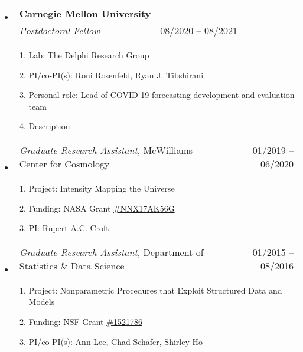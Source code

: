 \documentclass[letterpaper,10pt]{article}
\makeatletter
\newcommand{\subheadingoneline}[2]{
\begin{tabular*}{6.45in}{l@{\cftdotfill{\cftsecdotsep}\extracolsep{\fill}}r}
#1 & #2 \\ 
\end{tabular*}}
\newcommand{\subheadingtwolines}[4]{
\begin{tabular*}{6.45in}{l@{\cftdotfill{\cftsecdotsep}\extracolsep{\fill}}r}
#1 & #2 \\
#3 & #4 \\
\end{tabular*}}
\makeatother
\begin{document}
\begin{itemize}[leftmargin=0.4cm, itemsep=0.5cm]

\item[] \hspace{-2ex}\subheadingtwolines{\bf Carnegie Mellon University}{}{\emph{Postdoctoral Fellow}}{08/2020 -- 08/2021}
\vspace{-0.1cm}

\begin{enumerate}[leftmargin=0.5cm, itemsep=-0.05ex]
	\item[] Lab: The Delphi Research Group
	\item[] PI/co-PI(s): Roni Rosenfeld, Ryan J. Tibshirani
	\item[] Personal role: Lead of COVID-19 forecasting development and evaluation team
	\item[] Description:
\vspace{-0.1cm}
{}
\end{enumerate}

\item[] \hspace{-2ex}\subheadingoneline{{\it Graduate Research Assistant}, McWilliams Center for Cosmology}{01/2019 -- 06/2020}
\vspace{-0.1cm}

\begin{enumerate}[leftmargin=0.5cm, itemsep=-0.05ex]
	\item[] Project: Intensity Mapping the Universe
	\item[] Funding: NASA Grant \href{http://adsabs.harvard.edu/abs/2016atp..prop...26C}{\#NNX17AK56G}
	\item[] PI: Rupert A.C. Croft
\end{enumerate}

\item[] \hspace{-2ex}\subheadingoneline{{\it Graduate Research Assistant}, Department of Statistics \& Data Science}{01/2015 -- 08/2016}
\vspace{-0.1cm}

\begin{enumerate}[leftmargin=0.5cm, itemsep=-0.05ex]
	\item[] Project: Nonparametric Procedures that Exploit Structured Data and Models 
	\item[] Funding: NSF Grant \href{https://www.nsf.gov/awardsearch/showAward?AWD_ID=1521786}{\#1521786}
	\item[] PI/co-PI(s): Ann Lee, Chad Schafer, Shirley Ho
\end{enumerate}


\end{itemize}
\end{document}
